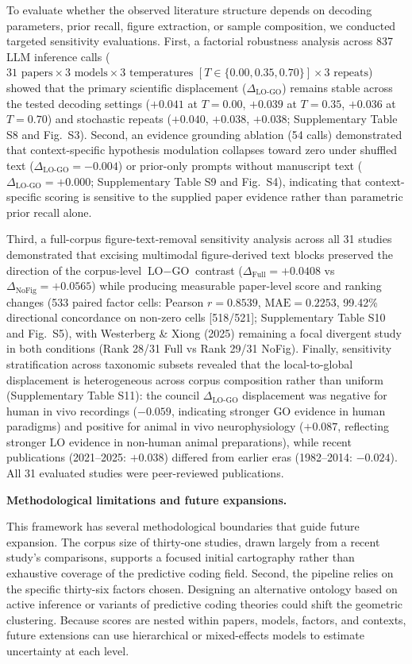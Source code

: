 \documentclass[12pt]{article}
\begin{document}
To evaluate whether the observed literature structure depends on decoding parameters, prior recall, figure extraction, or sample composition, we conducted targeted sensitivity evaluations. First, a factorial robustness analysis across 837 LLM inference calls ($31\text{ papers} \times 3\text{ models} \times 3\text{ temperatures } [T \in \{0.00, 0.35, 0.70\}] \times 3\text{ repeats}$) showed that the primary scientific displacement ($\Delta_{\text{LO-GO}}$) remains stable across the tested decoding settings ($+0.041$ at $T=0.00$, $+0.039$ at $T=0.35$, $+0.036$ at $T=0.70$) and stochastic repeats ($+0.040$, $+0.038$, $+0.038$; Supplementary Table S8 and Fig.~S3). Second, an evidence grounding ablation (54 calls) demonstrated that context-specific hypothesis modulation collapses toward zero under shuffled text ($\Delta_{\text{LO-GO}} = -0.004$) or prior-only prompts without manuscript text ($\Delta_{\text{LO-GO}} = +0.000$; Supplementary Table S9 and Fig.~S4), indicating that context-specific scoring is sensitive to the supplied paper evidence rather than parametric prior recall alone.

Third, a full-corpus figure-text-removal sensitivity analysis across all 31 studies demonstrated that excising multimodal figure-derived text blocks preserved the direction of the corpus-level $\text{LO}-\text{GO}$ contrast ($\Delta_{\text{Full}} = +0.0408$ vs $\Delta_{\text{NoFig}} = +0.0565$) while producing measurable paper-level score and ranking changes (533 paired factor cells: Pearson $r = 0.8539$, $\text{MAE} = 0.2253$, 99.42\% directional concordance on non-zero cells [518/521]; Supplementary Table S10 and Fig.~S5), with Westerberg \& Xiong (2025) remaining a focal divergent study in both conditions (Rank 28/31 Full vs Rank 29/31 NoFig). Finally, sensitivity stratification across taxonomic subsets revealed that the local-to-global displacement is heterogeneous across corpus composition rather than uniform (Supplementary Table S11): the council $\Delta_{\text{LO-GO}}$ displacement was negative for human in vivo recordings ($-0.059$, indicating stronger GO evidence in human paradigms) and positive for animal in vivo neurophysiology ($+0.087$, reflecting stronger LO evidence in non-human animal preparations), while recent publications (2021--2025: $+0.038$) differed from earlier eras (1982--2014: $-0.024$). All 31 evaluated studies were peer-reviewed publications.

\noindent\textbf{Methodological limitations and future expansions.}

This framework has several methodological boundaries that guide future expansion. The corpus size of thirty-one studies, drawn largely from a recent study's comparisons\cite{ref34}, supports a focused initial cartography rather than exhaustive coverage of the predictive coding field. Second, the pipeline relies on the specific thirty-six factors chosen. Designing an alternative ontology based on active inference or variants of predictive coding theories could shift the geometric clustering. Because scores are nested within papers, models, factors, and contexts, future extensions can use hierarchical or mixed-effects models to estimate uncertainty at each level.
\end{document}
